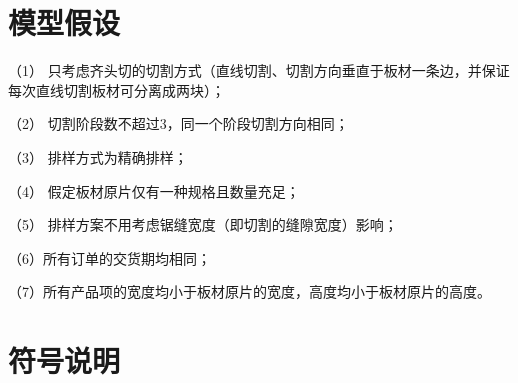 \documentclass[bwprint]{gmcmthesis}
\begin{document}
\newpage

\section{模型假设}

（1） 只考虑齐头切的切割方式（直线切割、切割方向垂直于板材一条边，并保证每次直线切割板材可分离成两块）；

（2） 切割阶段数不超过3，同一个阶段切割方向相同；

（3） 排样方式为精确排样；

（4） 假定板材原片仅有一种规格且数量充足；

（5） 排样方案不用考虑锯缝宽度（即切割的缝隙宽度）影响；

（6）所有订单的交货期均相同；

（7）所有产品项的宽度均小于板材原片的宽度，高度均小于板材原片的高度。

\quad

\section{符号说明}
\end{document}
